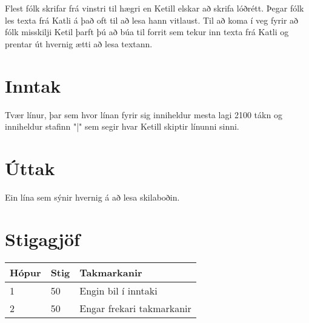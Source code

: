 
Flest fólk skrifar frá vinstri til hægri en 
Ketill elskar að skrifa lóðrétt. Þegar fólk 
les texta frá Katli á það oft til að lesa hann 
vitlaust. Til að koma í veg fyrir að fólk misskilji
Ketil þarft þú að búa til forrit sem tekur inn texta
frá Katli og prentar út hvernig ætti að lesa textann.

\section*{Inntak}
Tvær línur, þar sem hvor línan fyrir sig inniheldur mesta lagi 2100 tákn
og inniheldur stafinn "|" sem segir hvar Ketill
skiptir línunni sinni.

\section*{Úttak}
Ein lína sem sýnir hvernig á að lesa skilaboðin.

\section*{Stigagjöf}
\begin{tabular}{|l|l|l|}
\hline
Hópur & Stig & Takmarkanir \\ \hline
1     & 50   & Engin bil í inntaki \\ \hline
2     & 50   & Engar frekari takmarkanir\\ \hline
\end{tabular}

